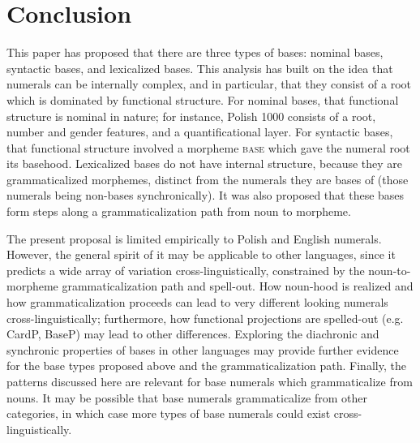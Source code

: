 \documentclass[output=paper]{langscibook}
\begin{document}
\section{Conclusion}\label{klo:discussion}

This paper has proposed that there are three types of bases: nominal bases, syntactic bases, and lexicalized bases. This analysis has built on the idea that numerals can be internally complex, and in particular, that they consist of a root which is dominated by functional structure. For nominal bases, that functional structure is nominal in nature; for instance, Polish 1000 consists of a root, number and gender features, and a quantificational layer. For syntactic bases, that functional structure involved a morpheme \textsc{base} which gave the numeral root its basehood. Lexicalized bases do not have internal structure, because they are grammaticalized morphemes, distinct from the numerals they are bases of (those numerals being non-bases synchronically). It was also proposed that these bases form steps along a grammaticalization path from noun to morpheme.

The present proposal is limited empirically to Polish and English numerals. However, the general spirit of it may be applicable to other languages, since it predicts a wide array of variation cross-linguistically, constrained by the noun-to-morpheme grammaticalization path and spell-out. How noun-hood is realized and how grammaticalization proceeds can lead to very different looking numerals cross-linguistically; furthermore, how functional projections are spelled-out (e.g. CardP, BaseP) may lead to other differences. Exploring the diachronic and synchronic properties of bases in other languages may provide further evidence for the base types proposed above and the grammaticalization path. Finally, the patterns discussed here are relevant for base numerals which grammaticalize from nouns. It may be possible that base numerals grammaticalize from other categories, in which case more types of base numerals could exist cross-linguistically.
\end{document}

